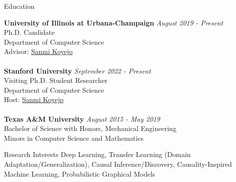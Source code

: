 \documentclass[11pt]{resume} %
\begin{document}


\begin{rSection}{Education}

\textbf{University of Illinois at Urbana-Champaign} \hfill {\em August 2019 - Present} 
\\ Ph.D. Candidate
\\ Department of Computer Science
\\Advisor: \href{http://sanmi.cs.illinois.edu/}{Sanmi Koyejo}\\
\\\textbf{Stanford University} \hfill {\em September 2022 - Present} 
\\ Visiting Ph.D. Student Researcher
\\ Department of Computer Science
\\Host: \href{http://sanmi.cs.illinois.edu/}{Sanmi Koyejo}\\
\\\textbf{Texas A\&M University} \hfill {\em August 2015 - May 2019} 
\\ Bachelor of Science with Honors, Mechanical Engineering
\\ Minors in Computer Science and Mathematics
\end{rSection}

\begin{rSection}{Research Interests}
Deep Learning, Transfer Learning (Domain Adaptation/Generalization), Causal Inference/Discovery, Causality-Inspired Machine Learning, Probabilistic Graphical Models
\end{rSection}

\end{document}

